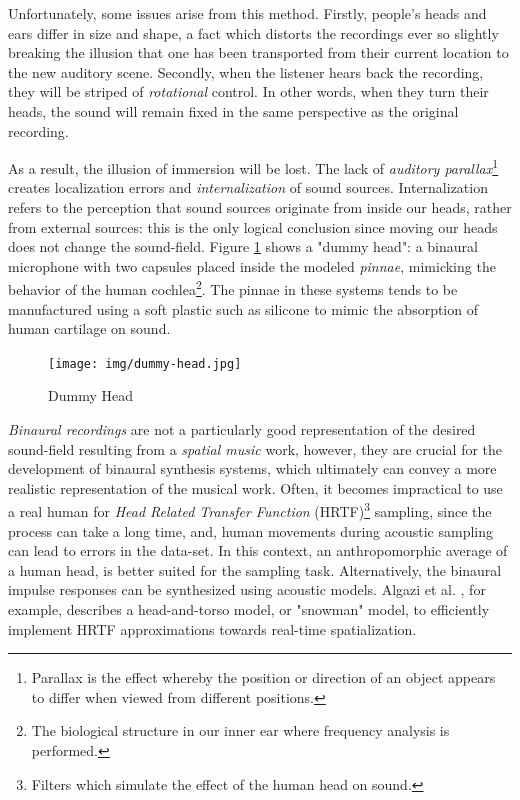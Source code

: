 Unfortunately, some issues arise from this method. Firstly, people's heads and ears differ in size and shape, a fact which distorts the recordings ever so slightly breaking the illusion that one has been transported from their current location to the new auditory scene. Secondly, when the listener hears back the recording, they will be striped of \textit{rotational} control. In other words, when they turn their heads, the sound will remain fixed in the same perspective as the original recording.

As a result, the illusion of immersion will be lost. The lack of \textit{auditory parallax}\footnote{Parallax is the effect whereby the position or direction of an object appears to differ when viewed from different positions.} creates localization errors and \textit{internalization} of sound sources. Internalization refers to the perception that sound sources originate from inside our heads, rather from external sources: this is the only logical conclusion since moving our heads does not change the sound-field. Figure \ref{fig:dummy-head} shows a "dummy head": a binaural microphone with two capsules placed inside the modeled \textit{pinnae}, mimicking the behavior of the human cochlea\footnote{The biological structure in our inner ear where frequency analysis is performed.}. The pinnae in these systems tends to be manufactured using a soft plastic such as silicone to mimic the absorption of human cartilage on sound.

\begin{figure}[ht!]%
\centering
\texttt{[image: img/dummy-head.jpg]} 
\caption{Dummy Head \cite{FileGeor45online}}
\label{fig:dummy-head}
\end{figure}

\textit{Binaural recordings} are not a particularly good representation of the desired sound-field resulting from a \textit{spatial music} work, however, they are crucial for the development of binaural synthesis systems, which ultimately can convey a more realistic representation of the musical work. Often, it becomes impractical to use a real human for \textit{Head Related Transfer Function} (HRTF)\footnote{Filters which simulate the effect of the human head on sound.} sampling, since the process can take a long time, and, human movements during acoustic sampling can lead to errors in the data-set. In this context, an anthropomorphic average of a human head, is better suited for the sampling task. Alternatively, the binaural impulse responses can be synthesized using acoustic models. Algazi et al. \cite{algazi2002use}, for example, describes a head-and-torso model, or "snowman" model, to efficiently implement HRTF approximations towards real-time spatialization. 


